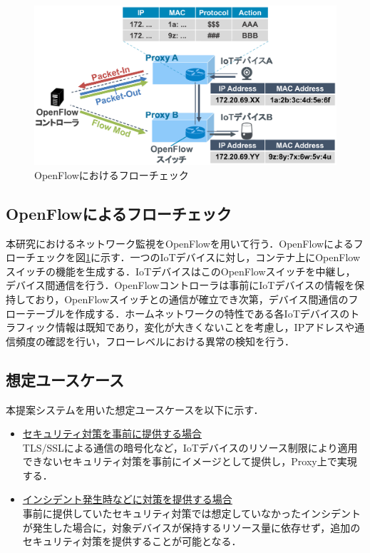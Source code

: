 \documentclass[Japanese]{dicomopapers}
\begin{document}
\begin{figure}[!tb]
	\centering
	\includegraphics[width=\linewidth]{img/openflow.eps}
	\caption{OpenFlowにおけるフローチェック}
	\label{fig:openflow}
\end{figure}

\subsection{OpenFlowによるフローチェック}
本研究におけるネットワーク監視をOpenFlowを用いて行う．OpenFlowによるフローチェックを図\ref{fig:openflow}に示す．一つのIoTデバイスに対し，コンテナ上にOpenFlowスイッチの機能を生成する．IoTデバイスはこのOpenFlowスイッチを中継し，デバイス間通信を行う．OpenFlowコントローラは事前にIoTデバイスの情報を保持しており，OpenFlowスイッチとの通信が確立でき次第，デバイス間通信のフローテーブルを作成する．ホームネットワークの特性である各IoTデバイスのトラフィック情報は既知であり，変化が大きくないことを考慮し，IPアドレスや通信頻度の確認を行い，フローレベルにおける異常の検知を行う．

\subsection{想定ユースケース}
本提案システムを用いた想定ユースケースを以下に示す．

\begin{itemize}
	\item \underline{セキュリティ対策を事前に提供する場合}\mbox{}\\
	      TLS/SSLによる通信の暗号化など，IoTデバイスのリソース制限により適用できないセキュリティ対策を事前にイメージとして提供し，Proxy上で実現する．
	\item \underline{インシデント発生時などに対策を提供する場合}\mbox{}\\
	      事前に提供していたセキュリティ対策では想定していなかったインシデントが発生した場合に，対象デバイスが保持するリソース量に依存せず，追加のセキュリティ対策を提供することが可能となる．
\end{itemize}
\end{document}
